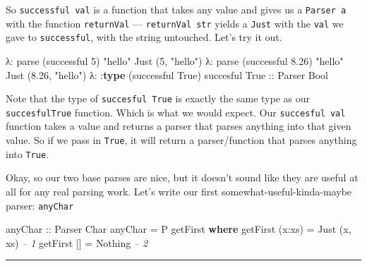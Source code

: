 \documentclass[]{article}
\newenvironment{Shaded}{}{}
\newcommand{\KeywordTok}[1]{\textcolor[rgb]{0.00,0.44,0.13}{\textbf{{#1}}}}
\newcommand{\DataTypeTok}[1]{\textcolor[rgb]{0.56,0.13,0.00}{{#1}}}
\newcommand{\DecValTok}[1]{\textcolor[rgb]{0.25,0.63,0.44}{{#1}}}
\newcommand{\FloatTok}[1]{\textcolor[rgb]{0.25,0.63,0.44}{{#1}}}
\newcommand{\StringTok}[1]{\textcolor[rgb]{0.25,0.44,0.63}{{#1}}}
\newcommand{\CommentTok}[1]{\textcolor[rgb]{0.38,0.63,0.69}{\textit{{#1}}}}
\newcommand{\OtherTok}[1]{\textcolor[rgb]{0.00,0.44,0.13}{{#1}}}
\newcommand{\FunctionTok}[1]{\textcolor[rgb]{0.02,0.16,0.49}{{#1}}}
\newcommand{\NormalTok}[1]{{#1}}
\begin{document}
So \texttt{successful\ val} is a function that takes any value and gives
us a \texttt{Parser\ a} with the function \texttt{returnVal} ---
\texttt{returnVal\ str} yields a \texttt{Just} with the \texttt{val} we
gave to \texttt{successful}, with the string untouched. Let's try it
out.

\begin{Shaded}
\begin{Highlighting}[]
\NormalTok{λ}\FunctionTok{:} \NormalTok{parse (successful }\DecValTok{5}\NormalTok{) }\StringTok{"hello"}
\DataTypeTok{Just} \NormalTok{(}\DecValTok{5}\NormalTok{, }\StringTok{"hello"}\NormalTok{)}
\NormalTok{λ}\FunctionTok{:} \NormalTok{parse (successful }\FloatTok{8.26}\NormalTok{) }\StringTok{"hello"}
\DataTypeTok{Just} \NormalTok{(}\FloatTok{8.26}\NormalTok{, }\StringTok{"hello"}\NormalTok{)}
\NormalTok{λ}\FunctionTok{:} \FunctionTok{:}\KeywordTok{type} \NormalTok{(successful }\DataTypeTok{True}\NormalTok{)}
\NormalTok{succesful }\DataTypeTok{True}\OtherTok{ ::} \DataTypeTok{Parser} \DataTypeTok{Bool}
\end{Highlighting}
\end{Shaded}

Note that the type of \texttt{succesful\ True} is exactly the same type
as our \texttt{succesfulTrue} function. Which is what we would expect.
Our \texttt{succesful\ val} function takes a value and returns a parser
that parses anything into that given value. So if we pass in
\texttt{True}, it will return a parser/function that parses anything
into \texttt{True}.

Okay, so our two base parses are nice, but it doesn't sound like they
are useful at all for any real parsing work. Let's write our first
somewhat-useful-kinda-maybe parser: \texttt{anyChar}

\begin{Shaded}
\begin{Highlighting}[]
\OtherTok{anyChar ::} \DataTypeTok{Parser} \DataTypeTok{Char}
\NormalTok{anyChar }\FunctionTok{=} \DataTypeTok{P} \NormalTok{getFirst}
    \KeywordTok{where}
        \NormalTok{getFirst (x}\FunctionTok{:}\NormalTok{xs) }\FunctionTok{=} \DataTypeTok{Just} \NormalTok{(x, xs)          }\CommentTok{-- 1}
        \NormalTok{getFirst []     }\FunctionTok{=} \DataTypeTok{Nothing}               \CommentTok{-- 2}
\end{Highlighting}
\end{Shaded}

\begin{center}\rule{0.5\linewidth}{\linethickness}\end{center}
\end{document}
